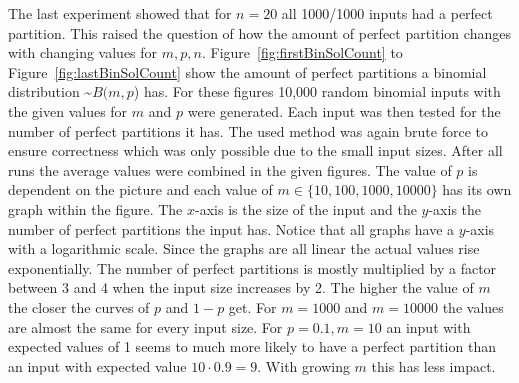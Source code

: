 The last experiment showed that for $n=20$ all 1000/1000 inputs had a perfect partition. This raised the question of how the amount of perfect partition changes with changing values for $m, p, n$.
Figure~\ref{fig:firstBinSolCount} to Figure~\ref{fig:lastBinSolCount} show the amount of perfect partitions a binomial distribution \textasciitilde$B(m,p$) has.
For these figures 10,000 random binomial inputs with the given values for $m$ and $p$ were generated.
Each input was then tested for the number of perfect partitions it has.
The used method was again brute force to ensure correctness which was only possible due to the small input sizes.
After all runs the average values were combined in the given figures.
The value of $p$ is dependent on the picture and each value of $m \in \{10,100,1000,10000\}$ has its own graph within the figure.
The $x$-axis is the size of the input and the $y$-axis the number of perfect partitions the input has.
Notice that all graphs have a $y$-axis with a logarithmic scale.
Since the graphs are all linear the actual values rise exponentially.
The number of perfect partitions is mostly multiplied by a factor between 3 and 4 when the input size increases by 2.\newline
The higher the value of $m$ the closer the curves of $p$ and $1-p$ get.
For $m=1000$ and $m=10000$ the values are almost the same for every input size.
For $p=0.1, m=10$ an input with expected values of 1 seems to much more likely to have a perfect partition than an input with expected value $10\cdot0.9=9$.
With growing $m$ this has less impact.

